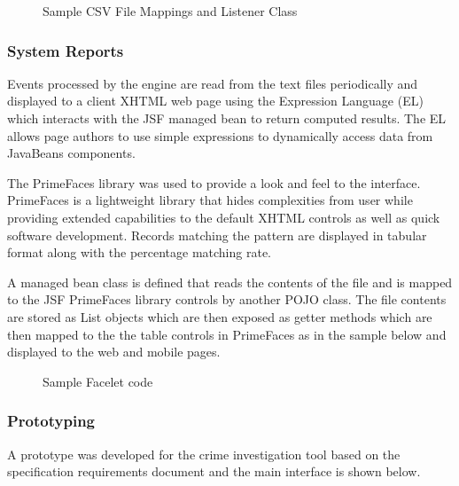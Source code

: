 \begin{center}
\begin{figure}[h]
\caption{Sample CSV File Mappings and Listener Class }

\end{figure}
\end{center}


\subsubsection{System Reports}

\noindent Events processed by the engine are read from the text files periodically and displayed to a client XHTML web page using the Expression Language (EL) \cite{twentythree} which interacts with the JSF \cite{twentythree}  managed bean to return computed results. The EL allows page authors to use simple expressions to dynamically access data from JavaBeans components. 

\noindent The PrimeFaces library \cite{twentyfour} was used to provide a look and feel to the interface. PrimeFaces is a lightweight library that hides complexities from user while providing extended capabilities to the default XHTML controls as well as quick software development. Records matching the pattern are displayed in tabular format along with the percentage matching rate. 

\noindent A managed bean class is defined that reads the contents of the file and is mapped to the JSF PrimeFaces library controls by another POJO class. The file contents are stored as List objects which are then exposed as getter methods which are then mapped to the the table controls in PrimeFaces as in the sample below and displayed to the web and mobile pages.

\begin{center}
\begin{figure}[h]
\caption{Sample Facelet code}

\end{figure}
\end{center}

\subsubsection{Prototyping}

\noindent A prototype was developed for the crime investigation tool based on the specification requirements document and the main interface is shown below.


